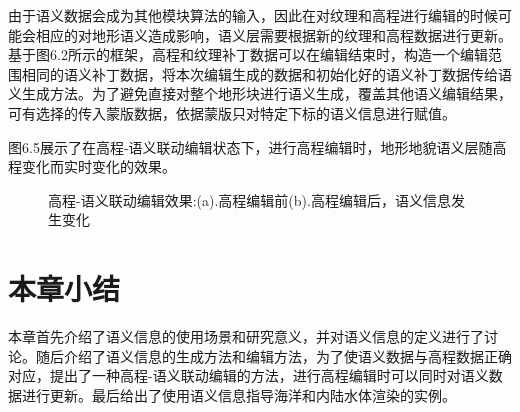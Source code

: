 由于语义数据会成为其他模块算法的输入，因此在对纹理和高程进行编辑的时候可能会相应的对地形语义造成影响，语义层需要根据新的纹理和高程数据进行更新。基于图6.2所示的框架，高程和纹理补丁数据可以在编辑结束时，构造一个编辑范围相同的语义补丁数据，将本次编辑生成的数据和初始化好的语义补丁数据传给语义生成方法。为了避免直接对整个地形块进行语义生成，覆盖其他语义编辑结果，可有选择的传入蒙版数据，依据蒙版只对特定下标的语义信息进行赋值。\par
图6.5展示了在高程-语义联动编辑状态下，进行高程编辑时，地形地貌语义层随高程变化而实时变化的效果。
\begin{figure}[H]
    \centering
    \caption{高程-语义联动编辑效果:(a).高程编辑前(b).高程编辑后，语义信息发生变化}
\end{figure}

\section{本章小结}
本章首先介绍了语义信息的使用场景和研究意义，并对语义信息的定义进行了讨论。随后介绍了语义信息的生成方法和编辑方法，为了使语义数据与高程数据正确对应，提出了一种高程-语义联动编辑的方法，进行高程编辑时可以同时对语义数据进行更新。最后给出了使用语义信息指导海洋和内陆水体渲染的实例。